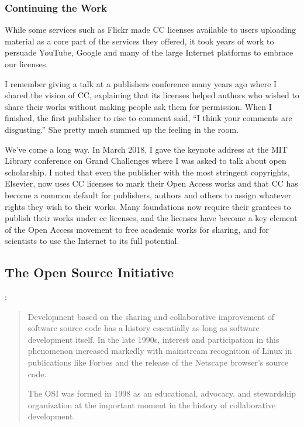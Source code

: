 \subsubsection {Continuing the Work}

While some services such as Flickr made \ac{CC} licenses available to users uploading material as a core part of the services they offered, it took years of work to persuade YouTube, Google and many of the large Internet platforms to embrace our licenses.

I remember giving a talk at a publishers conference many years ago where I shared the vision of \ac{CC}, explaining that its licenses helped authors who wished to share their works without making people ask them for permission. When I finished, the first publisher to rise to comment said, ``I think your comments are disgusting.'' She pretty much summed up the feeling in the room. 

We've come a long way. In March 2018, I gave the keynote address at the MIT Library conference on Grand Challenges where I was asked to talk about open scholarship. I noted that even the publisher with the most stringent copyrights, Elsevier, now uses \ac{CC} licenses to mark their Open Access works and that \ac{CC} has become a common default for publishers, authors and others to assign whatever rights they wish to their works. Many foundations now require their grantees to publish their works under \ac{cc} licenses, and the licenses have become a key element of the Open Access movement to free academic works for sharing, and for scientists to use the Internet to its full potential.

\subsection{The Open Source Initiative}
\label{sec:OSI}


\cite{Historyo84:online}:
\begin{quotation}
Development based on the sharing and collaborative improvement of software source code has a history essentially as long as software development itself. In the late 1990s, interest and participation in this phenomenon increased markedly with mainstream recognition of Linux in publications like Forbes and the release of the Netscape browser’s source code.

The \ac{OSI} was formed in 1998 as an educational, advocacy, and stewardship organization at the important moment in the history of collaborative development.
\end{quotation}


